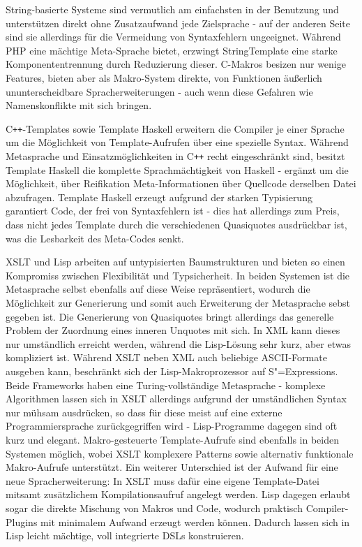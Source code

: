 \documentclass[11pt, a4paper, bibgerm]{book}
\newcommand{\sexps}{S"=Expressions}
\newcommand{\cpp}{C\texttt{++}}
\begin{document}
String-basierte Systeme sind vermutlich am einfachsten in der Benutzung
und unterstützen direkt ohne Zusatzaufwand jede Zielsprache - auf der
anderen Seite sind sie allerdings für die Vermeidung von Syntaxfehlern
ungeeignet. Während PHP eine mächtige Meta-Sprache bietet, erzwingt
StringTemplate eine starke Komponententrennung durch Reduzierung
dieser. C-Makros besizen nur wenige Features, bieten aber als
Makro-System direkte, von Funktionen äußerlich ununterscheidbare
Spracherweiterungen - auch wenn diese Gefahren wie Namenskonflikte mit
sich bringen.

\cpp{}-Templates sowie Template Haskell erweitern die Compiler je einer
Sprache um die Möglichkeit von Template-Aufrufen über eine spezielle
Syntax. Während Metasprache und Einsatzmöglichkeiten in \cpp{} recht
eingeschränkt sind, besitzt Template Haskell die komplette Sprachmächtigkeit
von Haskell - ergänzt um die Möglichkeit, über Reifikation
Meta-Informationen über Quellcode derselben Datei abzufragen. Template
Haskell erzeugt aufgrund der starken Typisierung garantiert Code, der
frei von Syntaxfehlern ist - dies hat allerdings zum Preis, dass nicht
jedes Template durch die verschiedenen Quasiquotes ausdrückbar ist, was
die Lesbarkeit des Meta-Codes senkt.

XSLT und Lisp arbeiten auf untypisierten Baumstrukturen und bieten so
einen Kompromiss zwischen Flexibilität und Typsicherheit. In beiden
Systemen ist die Metasprache selbst ebenfalls auf diese Weise
repräsentiert, wodurch die Möglichkeit zur Generierung und somit auch
Erweiterung der Metasprache sebst gegeben ist. Die Generierung von
Quasiquotes bringt allerdings das generelle Problem der Zuordnung eines
inneren Unquotes mit sich. In XML kann dieses nur umständlich erreicht
werden, während die Lisp-Lösung sehr kurz, aber etwas kompliziert
ist. Während XSLT neben XML auch beliebige ASCII-Formate ausgeben kann,
beschränkt sich der Lisp-Makroprozessor auf \sexps{}. Beide Frameworks
haben eine Turing-vollständige Metasprache - komplexe Algorithmen lassen
sich in XSLT allerdings aufgrund der umständlichen Syntax nur mühsam
ausdrücken, so dass für diese meist auf eine externe Programmiersprache
zurückgegriffen wird - Lisp-Programme dagegen sind oft kurz und
elegant. Makro-gesteuerte Template-Aufrufe sind ebenfalls in beiden
Systemen möglich, wobei XSLT komplexere Patterns sowie alternativ
funktionale Makro-Aufrufe unterstützt. Ein weiterer Unterschied ist der
Aufwand für eine neue Spracherweiterung: In XSLT muss dafür eine eigene
Template-Datei mitsamt zusätzlichem Kompilationsaufruf angelegt
werden. Lisp dagegen erlaubt sogar die direkte Mischung von Makros und
Code, wodurch praktisch Compiler-Plugins mit minimalem Aufwand erzeugt
werden können. Dadurch lassen sich in Lisp leicht mächtige, voll
integrierte DSLs konstruieren.
\end{document}
